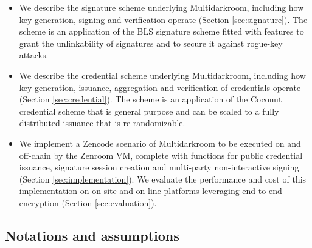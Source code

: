 \documentclass[twocolumn]{article}
\begin{document}
\begin{itemize}
\item We describe the signature scheme underlying Multidarkroom, including how
  key generation, signing and verification operate (Section
  \ref{sec:signature}). The scheme is an application of the BLS signature scheme
  \citep{asiacrypt-bls} fitted with features to grant the unlinkability of
  signatures and to secure it against rogue-key attacks.
\item We describe the credential scheme underlying Multidarkroom, including how
  key generation, issuance, aggregation and verification of credentials operate
  (Section \ref{sec:credential}). The scheme is an application of the Coconut
  credential scheme \citep{coconut-2018} that is general purpose and can be
  scaled to a fully distributed issuance that is re-randomizable.
\item We implement a Zencode scenario of Multidarkroom to be executed on and
  off-chain by the Zenroom VM, complete with functions for public credential
  issuance, signature session creation and multi-party non-interactive signing
  (Section \ref{sec:implementation}). We evaluate the performance and cost of
  this implementation on on-site and on-line platforms leveraging end-to-end
  encryption (Section \ref{sec:evaluation}).
\end{itemize}

\subsection*{Notations and assumptions}
\end{document}
